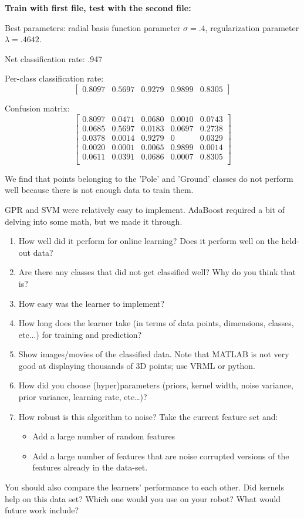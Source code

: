 \documentclass[letterpaper]{article}
\begin{document}
\textbf{Train with first file, test with the second file:}

Best parameters: radial basis function parameter $\sigma=.4$, regularization parameter $\lambda=.4642$.

Net classification rate: .947

Per-class classification rate: 
$$\begin{bmatrix}0.8097  &  0.5697   & 0.9279   & 0.9899  &  0.8305\end{bmatrix}$$

Confusion matrix:
$$\begin{bmatrix}
0.8097&    0.0471&    0.0680  &  0.0010  &  0.0743\\
    0.0685&    0.5697&    0.0183&    0.0697  &  0.2738\\
    0.0378   & 0.0014&    0.9279  &       0 &   0.0329\\
    0.0020 &   0.0001 &   0.0065 &   0.9899  &  0.0014\\
    0.0611   & 0.0391  &  0.0686  &  0.0007&    0.8305\\
\end{bmatrix}$$

We find that points belonging to the 'Pole' and 'Ground' classes do not perform well
because there is not enough data to train them.

GPR and SVM were relatively easy to implement. AdaBoost required a bit of delving into some math, but 
we made it through.



\begin{enumerate}
\item How well did it perform for online learning?  Does it perform well on the held-out data?
\item Are there any classes that did not get classified well?  Why do you think that is?
\item How easy was the learner to implement?
\item How long does the learner take (in terms of data points, dimensions, classes, etc...) for training and prediction?
\item Show images/movies of the classified data.  Note that MATLAB is not very good at displaying thousands of 3D points; use VRML or python.
\item How did you choose (hyper)parameters (priors, kernel width, noise variance, prior variance, learning rate, etc\ldots)?
\item How robust is this algorithm to noise? Take the current feature set and:
  \begin{itemize}
  \item Add a large number of random features
  \item Add a large number of features that are noise corrupted versions of the features already in the data-set.
  \end{itemize}

\end{enumerate}

You should also compare the learners' performance to each other.  Did kernels help on this data set?  Which one would you use on your robot?  What would future work include?
\end{document}
